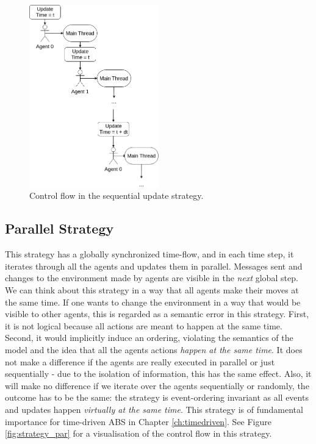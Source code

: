 \begin{figure}[H]
	\centering
	\includegraphics[width=0.5\textwidth, angle=0]{./fig/implabs/sequential.png}
	\caption[Control flow in the sequential update strategy]{Control flow in the sequential update strategy.}
	\label{fig:strategy_seq}
\end{figure}

\subsection{Parallel Strategy}
\label{sub:par_strategy}
This strategy has a globally synchronized time-flow, and in each time step, it iterates through all the agents and updates them in parallel. Messages sent and changes to the environment made by agents are visible in the \textit{next} global step. We can think about this strategy in a way that all agents make their moves at the same time.  If one wants to change the environment in a way that would be visible to other agents, this is regarded as a semantic error in this strategy. First, it is not logical because all actions are meant to happen at the same time. Second, it would implicitly induce an ordering, violating the semantics of the model and the idea that all the agents actions \textit{happen at the same time}.
It does not make a difference if the agents are really executed in parallel or just sequentially - due to the isolation of information, this has the same effect. Also, it will make no difference if we iterate over the agents sequentially or randomly, the outcome has to be the same: the strategy is event-ordering invariant as all events and updates happen \textit{virtually at the same time}. This strategy is of fundamental importance for time-driven ABS in Chapter \ref{ch:timedriven}. See Figure \ref{fig:strategy_par} for a visualisation of the control flow in this strategy.

